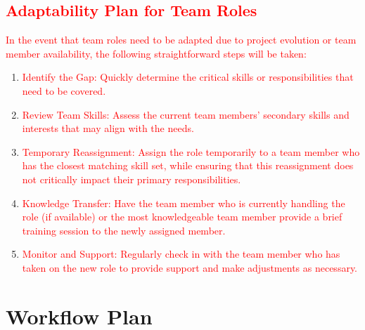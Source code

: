 \documentclass{article}
\begin{document}
\subsection{\textcolor{red}{Adaptability Plan for Team Roles}}

\textcolor{red}{In the event that team roles need to be adapted due to project 
evolution or team member availability, the following straightforward steps 
will be taken:}

\begin{enumerate}
  \item \textcolor{red}{Identify the Gap: Quickly determine the critical skills 
  or responsibilities that need to be covered.}
  \item \textcolor{red}{Review Team Skills: Assess the current team members’ 
  secondary skills and interests that may align with the needs.}
  \item \textcolor{red}{Temporary Reassignment: Assign the role temporarily to 
  a team member who has the closest matching skill set, while ensuring that this 
  reassignment does not critically impact their primary responsibilities.}
  \item \textcolor{red}{Knowledge Transfer: Have the team member who is currently 
  handling the role (if available) or the most knowledgeable team member provide 
  a brief training session to the newly assigned member.}
  \item \textcolor{red}{Monitor and Support: Regularly check in with the team 
  member who has taken on the new role to provide support and make adjustments 
  as necessary.}
\end{enumerate}

\section{Workflow Plan}
\end{document}

